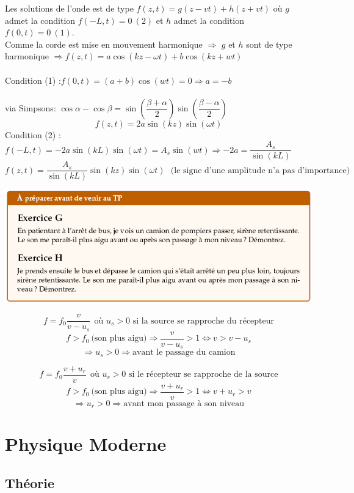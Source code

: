 \documentclass	[11pt, a4paper, openany]{book}
\begin{document}
Les solutions de l'onde est de type $f(z,t)=g(z-vt)+h(z+vt)$ où $g$ admet la condition $f(-L,t)=0\ (2)$ et $h$ admet la condition $f(0,t)=0\ (1)$.\\
Comme la corde est mise en mouvement harmonique $\Rightarrow$ $g$ et $h$ sont de type harmonique $\Rightarrow f(z,t)=a\cos(kz-\omega t)+b\cos(kz+wt)$\\\\
Condition (1) :$f(0,t)=(a+b)\cos(wt)=0\Rightarrow a=-b$\\\\
via Simpsons: $\cos\alpha-\cos\beta=\sin\left(\dfrac{\beta+\alpha}{2}\right)\sin\left(\dfrac{\beta-\alpha}{2}\right)$
$$f(z,t)=2a\sin(kz)\sin(\omega t)$$
Condition (2) : $f(-L,t)=-2a\sin(kL)\sin(\omega t)=A_s\sin(wt)\Rightarrow-2a=\dfrac{A_s}{\sin(kL)}$
$$f(z,t)=\frac{A_s}{\sin(kL)}\sin(kz)\sin(\omega t)\ \ \ \text{(le signe d'une amplitude n'a pas d'importance)}$$

\begin{center}
\includegraphics[scale=0.85]{prepa/Ondes-GH.png}\\
\end{center}
$$f=f_0\frac{v}{v-u_s}\ \ \text{où $u_s>0$ si la source se rapproche du récepteur}$$
$$f>f_0\ \text{(son plus aigu)} \Rightarrow \frac{v}{v-u_s}>1\Leftrightarrow v>v-u_s$$
$$\Rightarrow u_s>0\Rightarrow\text{avant le passage du camion}$$

$$f=f_0\frac{v+u_r}{v}\ \ \text{où $u_r>0$ si le récepteur se rapproche de la source}$$
$$f>f_0\ \text{(son plus aigu)} \Rightarrow \frac{v+u_r}{v}>1\Leftrightarrow v+u_r>v$$
$$\Rightarrow u_r>0\Rightarrow\text{avant mon passage à son niveau}$$


\newpage
\section{Physique Moderne}
\subsection{Théorie}
\end{document}
